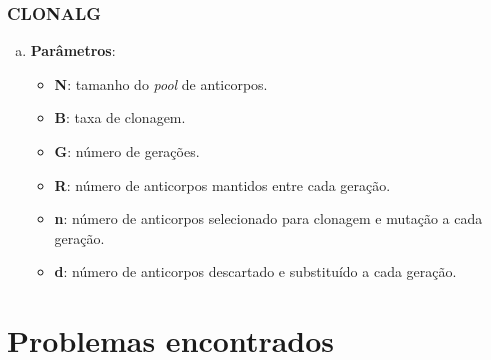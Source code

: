 \subsubsection{CLONALG}

\begin{enumerate}[a)]
    \item \textbf{Parâmetros}:
        \begin{itemize}

            \item \textbf{N}: tamanho do \emph{pool} de anticorpos.

            \item \textbf{B}: taxa de clonagem.

            \item \textbf{G}: número de gerações.

            \item \textbf{R}: número de anticorpos mantidos entre cada geração.

            \item \textbf{n}: número de anticorpos selecionado para clonagem e mutação a cada geração.

            \item \textbf{d}: número de anticorpos descartado e substituído a cada geração.
        \end{itemize}
\end{enumerate}

\section{Problemas encontrados}
\label{sec:dev_weka_issues}

